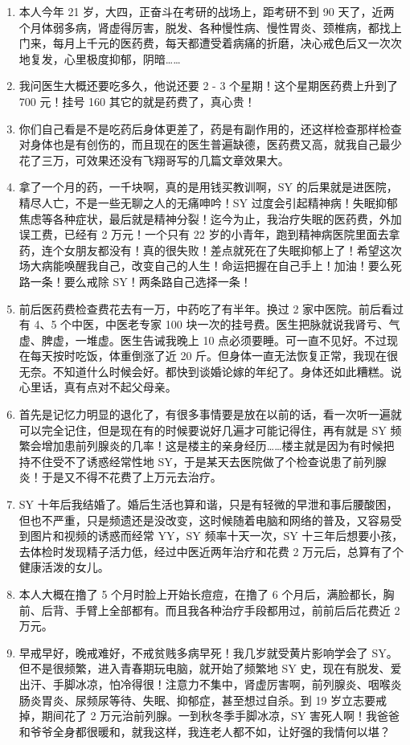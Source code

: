 \documentclass{ctexart}
\begin{document}
\begin{enumerate}
    \item 本人今年 21 岁，大四，正奋斗在考研的战场上，距考研不到 90 天了，近两个月体弱多病，肾虚得厉害，脱发、各种慢性病、慢性胃炎、颈椎病，都找上门来，每月上千元的医药费，每天都遭受着病痛的折磨，决心戒色后又一次次地复发，心里极度抑郁，阴暗……
    \item 我问医生大概还要吃多久，他说还要 2 - 3 个星期！这个星期医药费上升到了 700 元！挂号 160 其它的就是药费了，真心贵！
    \item 你们自己看是不是吃药后身体更差了，药是有副作用的，还这样检查那样检查对身体也是有创伤的，而且现在的医生普遍缺德，医药费又高，就我自己最少花了三万，可效果还没有飞翔哥写的几篇文章效果大。
    \item 拿了一个月的药，一千块啊，真的是用钱买教训啊，SY 的后果就是进医院，精尽人亡，不是一些无聊之人的无痛呻吟！SY 过度会引起精神病！失眠抑郁焦虑等各种症状，最后就是精神分裂！迄今为止，我治疗失眠的医药费，外加误工费，已经有 2 万元！一个只有 22 岁的小青年，跑到精神病医院里面去拿药，连个女朋友都没有！真的很失败！差点就死在了失眠抑郁上了！希望这次场大病能唤醒我自己，改变自己的人生！命运把握在自己手上！加油！要么死路一条！要么戒除 SY！两条路自己选择一条！
    \item 前后医药费检查费花去有一万，中药吃了有半年。换过 2 家中医院。前后看过有 4、5 个中医，中医老专家 100 块一次的挂号费。医生把脉就说我肾亏、气虚、脾虚，一堆虚。医生告诫我晚上 10 点必须要睡。可一直不见好。不过现在每天按时吃饭，体重倒涨了近 20 斤。但身体一直无法恢复正常，我现在很无奈。不知道什么时候会好。都快到谈婚论嫁的年纪了。身体还如此糟糕。说心里话，真有点对不起父母亲。
    \item 首先是记忆力明显的退化了，有很多事情要是放在以前的话，看一次听一遍就可以完全记住，但是现在有的时候要说好几遍才可能记得住，再有就是 SY 频繁会增加患前列腺炎的几率！这是楼主的亲身经历……楼主就是因为有时候把持不住受不了诱惑经常性地 SY，于是某天去医院做了个检查说患了前列腺炎！于是又不得不花费了上万元去治疗。
    \item SY 十年后我结婚了。婚后生活也算和谐，只是有轻微的早泄和事后腰酸困，但也不严重，只是频遗还是没改变，这时候随着电脑和网络的普及，又容易受到图片和视频的诱惑而经常 YY，SY 频率十天一次，SY 十三年后想要小孩，去体检时发现精子活力低，经过中医近两年治疗和花费 2 万元后，总算有了个健康活泼的女儿。
    \item 本人大概在撸了 5 个月时脸上开始长痘痘，在撸了 6 个月后，满脸都长，胸前、后背、手臂上全部都有。而且我各种治疗手段都用过，前前后后花费近 2 万元。
    \item 早戒早好，晚戒难好，不戒贫贱多病早死！我几岁就受黄片影响学会了 SY。但不是很频繁，进入青春期玩电脑，就开始了频繁地 SY 史，现在有脱发、爱出汗、手脚冰凉，怕冷得很！注意力不集中，肾虚厉害啊，前列腺炎、咽喉炎肠炎胃炎、尿频尿等待、失眠、抑郁症，甚至想过自杀。到 19 岁立志要戒掉，期间花了 2 万元治前列腺。一到秋冬季手脚冰凉，SY 害死人啊！我爸爸和爷爷全身都很暖和，就我这样，我连老人都不如，让好强的我情何以堪？

\end{enumerate}
\end{document}

